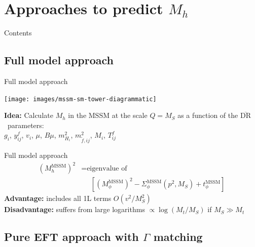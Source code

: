 \documentclass[hyperref={pdfpagelabels=false},ngerman]{beamer}
\renewcommand{\emph}{\textbf}
\newcommand{\DRbar}{\ensuremath{\overline{\text{DR}}}}
\begin{document}

\section{Approaches to predict $M_h$}

\begin{frame}{Contents}
  \tableofcontents[currentsection]  
\end{frame}

\subsection{Full model approach}

\begin{frame}{Full model approach}
  \begin{center}
    \texttt{[image: images/mssm-sm-tower-diagrammatic]}\\[1em]
  \end{center}
  \emph{Idea:} Calculate $M_h$ in the MSSM at the scale $Q = M_S$ as a function of the \DRbar\ parameters:\\[1em]
  \centering $g_i$, $y^f_{ij}$, $v_i$, $\mu$, $B\mu$, $m^2_{H_i}$,
  $m_{\tilde{f},ij}^2$, $M_i$, $T^f_{ij}$
\end{frame}

\begin{frame}{Full model approach}
  \begin{align*}
    (M_h^\text{MSSM})^2 &= \text{eigenvalue of} \\
    &\phantom{={}} \left[(M_\phi^\text{MSSM})^2 - \Sigma^\text{MSSM}_\phi(p^2,M_S)
      + t_\phi^\text{MSSM}\right]
  \end{align*}
  \emph{Advantage:} includes all 1L terms $O(v^2/M_S^2)$\\
  \emph{Disadvantage:} suffers from large logarithms $\propto\log(M_t/M_S)$ if $M_S\gg M_t$\\
\end{frame}


\subsection{Pure EFT approach with $\Gamma$ matching}
\end{document}
